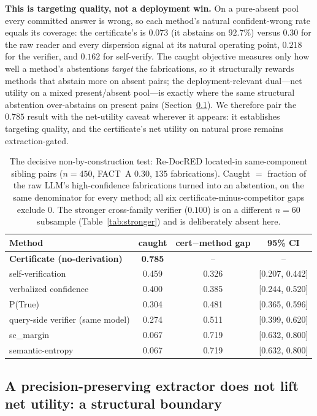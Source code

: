 \documentclass[11pt,letterpaper]{article}
\begin{document}
\textbf{This is targeting quality, not a deployment win.} On a pure-absent pool every committed answer is wrong, so each method's natural confident-wrong rate equals its coverage: the certificate's is $0.073$ (it abstains on $92.7\%$) versus $0.30$ for the raw reader and every dispersion signal at its natural operating point, $0.218$ for the verifier, and $0.162$ for self-verify. The caught objective measures only how well a method's abstentions \emph{target} the fabrications, so it structurally rewards methods that abstain more on absent pairs; the deployment-relevant dual---net utility on a mixed present/absent pool---is exactly where the same structural abstention over-abstains on present pairs (Section~\ref{sec:boundary}). We therefore pair the $0.785$ result with the net-utility caveat wherever it appears: it establishes targeting quality, and the certificate's net utility on natural prose remains extraction-gated.

\begin{table}[t]
\centering
\small
\begin{tabular}{lccc}
\hline
Method & caught & cert$-$method gap & 95\% CI \\
\hline
\textbf{Certificate (no-derivation)} & \textbf{0.785} & -- & -- \\
self-verification & 0.459 & 0.326 & [0.207, 0.442] \\
verbalized confidence & 0.400 & 0.385 & [0.244, 0.520] \\
P(True) & 0.304 & 0.481 & [0.365, 0.596] \\
query-side verifier (same model) & 0.274 & 0.511 & [0.399, 0.620] \\
sc\_margin & 0.067 & 0.719 & [0.632, 0.800] \\
semantic-entropy & 0.067 & 0.719 & [0.632, 0.800] \\
\hline
\end{tabular}
\caption{The decisive non-by-construction test: Re-DocRED located-in same-component sibling pairs ($n{=}450$, FACT~A $0.30$, $135$ fabrications). Caught $=$ fraction of the raw LLM's high-confidence fabrications turned into an abstention, on the same denominator for every method; all six certificate-minus-competitor gaps exclude $0$. The stronger cross-family verifier ($0.100$) is on a different $n{=}60$ subsample (Table~\ref{tab:stronger}) and is deliberately absent here.}
\label{tab:locatedin}
\end{table}

\subsection{A precision-preserving extractor does not lift net utility: a structural boundary}
\label{sec:boundary}
\end{document}
